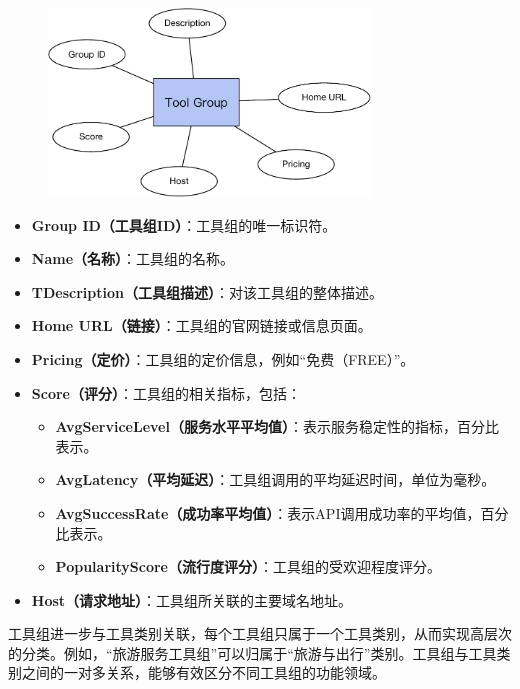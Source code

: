 \begin{figure}[H]
    \vspace{1em}
    \centering
    \setlength{\abovecaptionskip}{10pt} %
    \includegraphics[height=5cm]{../assets/图谱格式-tool group.pdf}
    \label{fig:ch3-kg-tool-group}
  \end{figure}

\begin{itemize}
    \item \textbf{Group ID（工具组ID）}：工具组的唯一标识符。
    \item \textbf{Name（名称）}：工具组的名称。
    \item \textbf{TDescription（工具组描述）}：对该工具组的整体描述。
    \item \textbf{Home URL（链接）}：工具组的官网链接或信息页面。
    \item \textbf{Pricing（定价）}：工具组的定价信息，例如``免费（FREE）''。
    \item \textbf{Score（评分）}：工具组的相关指标，包括：
        \begin{itemize}
            \item \textbf{AvgServiceLevel（服务水平平均值）}：表示服务稳定性的指标，百分比表示。
            \item \textbf{AvgLatency（平均延迟）}：工具组调用的平均延迟时间，单位为毫秒。
            \item \textbf{AvgSuccessRate（成功率平均值）}：表示API调用成功率的平均值，百分比表示。
            \item \textbf{PopularityScore（流行度评分）}：工具组的受欢迎程度评分。
        \end{itemize}
    \item \textbf{Host（请求地址）}：工具组所关联的主要域名地址。
\end{itemize}

工具组进一步与工具类别关联，每个工具组只属于一个工具类别，从而实现高层次的分类。例如，“旅游服务工具组”可以归属于“旅游与出行”类别。工具组与工具类别之间的一对多关系，能够有效区分不同工具组的功能领域。


